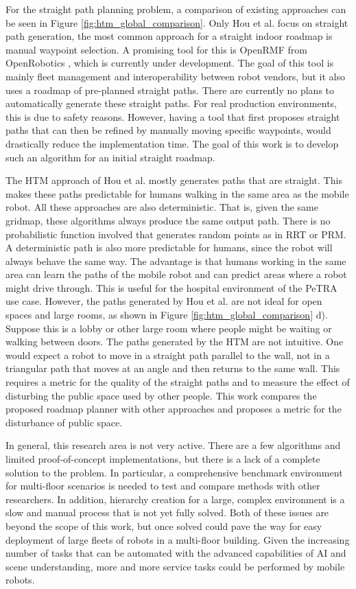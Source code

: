 For the straight path planning problem, a comparison of existing approaches can be seen in Figure \ref{fig:htm_global_comparison}. Only Hou et al. focus on straight path generation, the most common approach for a straight indoor roadmap is manual waypoint selection. A promising tool for this is OpenRMF from OpenRobotics \cite{openrobotics_open-rmf_2023}, which is currently under development. The goal of this tool is mainly fleet management and interoperability between robot vendors, but it also uses a roadmap of pre-planned straight paths. There are currently no plans to automatically generate these straight paths. For real production environments, this is due to safety reasons. However, having a tool that first proposes straight paths that can then be refined by manually moving specific waypoints, would drastically reduce the implementation time. The goal of this work is to develop such an algorithm for an initial straight roadmap.

The HTM approach of Hou et al. mostly generates paths that are straight. This makes these paths predictable for humans walking in the same area as the mobile robot. All these approaches are also deterministic. That is, given the same gridmap, these algorithms always produce the same output path. There is no probabilistic function involved that generates random points as in RRT or PRM. A deterministic path is also more predictable for humans, since the robot will always behave the same way. The advantage is that humans working in the same area can learn the paths of the mobile robot and can predict areas where a robot might drive through. This is useful for the hospital environment of the PeTRA use case. However, the paths generated by Hou et al. are not ideal for open spaces and large rooms, as shown in Figure \ref{fig:htm_global_comparison} d). Suppose this is a lobby or other large room where people might be waiting or walking between doors. The paths generated by the HTM are not intuitive. One would expect a robot to move in a straight path parallel to the wall, not in a triangular path that moves at an angle and then returns to the same wall. This requires a metric for the quality of the straight paths and to measure the effect of disturbing the public space used by other people. This work compares the proposed roadmap planner with other approaches and proposes a metric for the disturbance of public space.

In general, this research area is not very active. There are a few algorithms and limited proof-of-concept implementations, but there is a lack of a complete solution to the problem. In particular, a comprehensive benchmark environment for multi-floor scenarios is needed to test and compare methods with other researchers. In addition, hierarchy creation for a large, complex environment is a slow and manual process that is not yet fully solved. Both of these issues are beyond the scope of this work, but once solved could pave the way for easy deployment of large fleets of robots in a multi-floor building. Given the increasing number of tasks that can be automated with the advanced capabilities of AI and scene understanding, more and more service tasks could be performed by mobile robots.